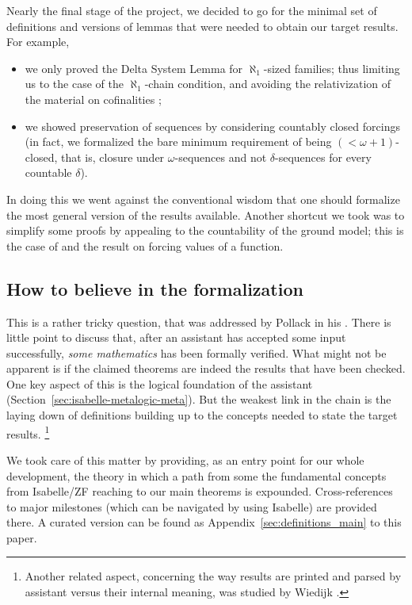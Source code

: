 Nearly the final stage of the project, we decided to go for the minimal
set of definitions and versions of lemmas that were needed to obtain
our target results. For example,
\begin{itemize}
\item
  we only proved the Delta System Lemma for $\aleph_1$-sized families;
  thus limiting us to the case of the $\aleph_1$-chain condition, and avoiding the relativization
  of the material on cofinalities \cite{Delta_System_Lemma-AFP};
\item we showed preservation of sequences by considering countably
  closed forcings (in fact, we formalized the bare minimum requirement
  of being $({<}\omega{+}1)$-closed, that is, closure under
  $\omega$-sequences and not $\delta$-sequences for every countable $\delta$).
\end{itemize}
In doing this we went against the conventional wisdom that one should formalize the most general version of the
results available. Another shortcut we took was to
simplify some proofs by appealing to the countability of the ground
model; this is the case of
 and the result on forcing
values of a function.

\subsection{How to believe in the formalization}
\label{sec:how-believe-formalization}

This is a rather tricky question, that was addressed by Pollack in his
\cite{MR1686867}. There is little point to discuss that, after an
assistant has accepted some input successfully, \emph{some
mathematics} has been formally verified. What might not be apparent is
if the claimed theorems are indeed the results that have been
checked. One key aspect of this is the logical foundation of the
assistant (Section~\ref{sec:isabelle-metalogic-meta}). But the weakest
link in the chain is the laying down of definitions building up to the
concepts needed to state the target results.%
\footnote{%
Another related aspect,
concerning the way results are printed and parsed by assistant versus
their internal meaning, was studied by Wiedijk \cite{zbMATH06319597}.}

We took care of this matter by providing, as an entry point for our
whole development, the theory  in which a
path from some the fundamental concepts from Isabelle/ZF reaching to our main theorems
is expounded. Cross-references to major milestones (which can be
navigated by using Isabelle) are provided there. A curated version can
be found as Appendix~\ref{sec:definitions_main} to this paper.

